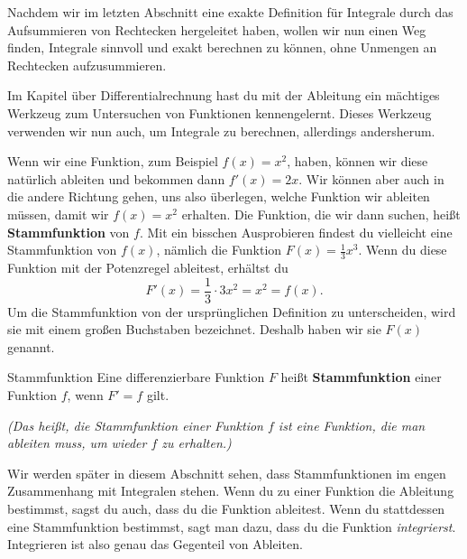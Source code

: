 \documentclass[../../main.tex]{subfiles}
\begin{document}
Nachdem wir im letzten Abschnitt eine exakte Definition für Integrale durch das Aufsummieren von Rechtecken hergeleitet 
haben, wollen wir nun einen Weg finden, Integrale sinnvoll und exakt berechnen zu können, ohne Unmengen an Rechtecken
aufzusummieren.

Im Kapitel über Differentialrechnung hast du mit der Ableitung ein mächtiges Werkzeug zum Untersuchen von Funktionen
kennengelernt. Dieses Werkzeug verwenden wir nun auch, um Integrale zu berechnen, allerdings andersherum. 

Wenn wir eine Funktion, zum Beispiel $f(x)=x^2$, haben, können wir diese natürlich ableiten und bekommen dann $f'(x)=2x$. Wir können
aber auch in die andere Richtung gehen, uns also überlegen, welche Funktion wir ableiten müssen, damit wir $f(x)=x^2$ 
erhalten. Die Funktion, die wir dann suchen, heißt \textbf{Stammfunktion} von $f$. Mit ein bisschen Ausprobieren findest
du vielleicht eine Stammfunktion von $f(x)$, nämlich die Funktion $F(x)=\frac{1}{3}x^3$. Wenn du diese Funktion mit der
Potenzregel ableitest, erhältst du
\[F'(x)=\frac{1}{3}\cdot 3x^2=x^2=f(x).\]
Um die Stammfunktion von der ursprünglichen Definition zu unterscheiden, wird sie mit einem großen Buchstaben bezeichnet.
Deshalb haben wir sie $F(x)$ genannt.
\begin{definition}{Stammfunktion}
    Eine differenzierbare Funktion $F$ heißt \textbf{Stammfunktion} einer Funktion $f$, wenn  $F'=f$ gilt. 

    \emph{(Das heißt, die Stammfunktion einer Funktion $f$ ist eine Funktion, die man ableiten muss, um wieder $f$ zu erhalten.)}
\end{definition}
Wir werden später in diesem Abschnitt sehen, dass Stammfunktionen im engen Zusammenhang mit Integralen stehen. Wenn du
zu einer Funktion die Ableitung bestimmst, sagst du auch, dass du die Funktion ableitest. Wenn du stattdessen eine 
Stammfunktion bestimmst, sagt man dazu, dass du die Funktion \emph{integrierst}. Integrieren ist also genau das 
Gegenteil von Ableiten.
\end{document}
